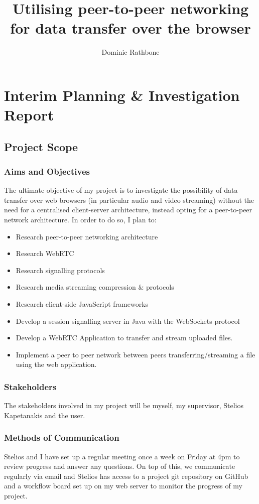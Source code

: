 \documentclass[]{report}
\title{Utilising peer-to-peer networking for data transfer over the browser}
\author{Dominic Rathbone}
\begin{document}
\maketitle
\tableofcontents
\listoftodos

\chapter{Interim Planning \& Investigation Report}
	\section{Project Scope}
		\subsection*{Aims and Objectives}
			The ultimate objective of my project is to investigate the possibility of data transfer over web browsers (in particular audio and video streaming) without the need for a centralised client-server architecture, instead opting for a peer-to-peer network architecture. In order to do so, I plan to:
			\begin{itemize}
				\item Research peer-to-peer networking architecture
				\item Research WebRTC
				\item Research signalling protocols
				\item Research media streaming compression \& protocols
				\item Research client-side JavaScript frameworks
				\item Develop a session signalling server in Java with the WebSockets protocol
				\item Develop a WebRTC Application to transfer and stream uploaded files.
				\item Implement a peer to peer network between peers transferring/streaming a file using the web application.
			\end{itemize}
		\subsection*{Stakeholders}
			The stakeholders involved in my project will be myself, my supervisor, Stelios Kapetanakis and the user.
		\subsection*{Methods of Communication}
			Stelios and I have set up a regular meeting once a week on Friday at 4pm to review progress and answer any questions. On top of this, we communicate regularly via email and Stelios has access to a project git repository on GitHub and a workflow board set up on my web server to monitor the progress of my project. 
			
\end{document}
